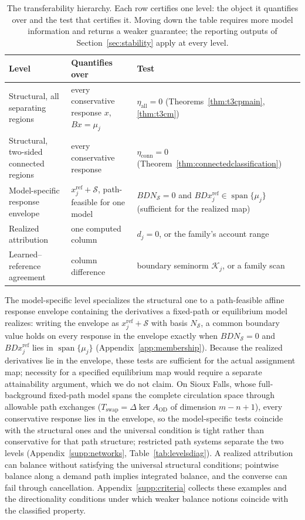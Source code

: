 \documentclass[a4paper,fleqn]{cas-sc}
\begin{document}
\begin{table}[pos=tb]
\footnotesize
\caption{The transferability hierarchy. Each row certifies one level:
the object it quantifies over and the test that certifies it. Moving
down the table requires more model information and returns a weaker
guarantee; the reporting outputs of
Section~\ref{sec:stability} apply at every level.}
\label{tab:threequestions}
\begin{tabular*}{\tblwidth}{@{}p{4.35cm}p{4.5cm}p{5.0cm}@{}}
\toprule Level & Quantifies over & Test\\\midrule
Structural, all separating regions & every conservative response $x$, $Bx=\mu_j$ & $\eta_{\mathrm{all}}=0$ (Theorems~\ref{thm:t3cpmain}, \ref{thm:t3cm})\\
Structural, two-sided connected regions & every conservative response & $\eta_{\mathrm{conn}}=0$ (Theorem~\ref{thm:connectedclassification})\\
Model-specific response envelope & $x_j^{\mathrm{ref}}+\mathcal S$, path-feasible for one model & $BDN_{\mathcal S}=0$ and $BDx_j^{\mathrm{ref}}\in\operatorname{span}\{\mu_j\}$ (sufficient for the realized map)\\
Realized attribution & one computed column & $d_j=0$, or the family's account range\\
Learned--reference agreement & column difference & boundary seminorm $\mathcal K_j$, or a family scan\\
\bottomrule\end{tabular*}\end{table}
The model-specific level specializes the structural one to a
path-feasible affine response envelope containing the derivatives a
fixed-path or equilibrium model realizes: writing the envelope as
$x_j^{\mathrm{ref}}+\mathcal S$ with basis $N_{\mathcal S}$, a common
boundary value holds on every response in the envelope exactly when
$BDN_{\mathcal S}=0$ and $BDx_j^{\mathrm{ref}}$ lies in
$\operatorname{span}\{\mu_j\}$
(Appendix~\ref{app:membership}). Because the realized derivatives lie
in the envelope, these tests are sufficient for the actual assignment
map; necessity for a specified equilibrium map would require a
separate attainability argument, which we do not claim. On Sioux
Falls, whose full-background fixed-path model spans the complete
circulation space through allowable path exchanges
($T_{\mathrm{swap}}=\Delta\ker A_{\mathrm{OD}}$ of dimension
$m-n+1$), every conservative response lies in the envelope, so the
model-specific tests coincide with the structural ones and the
universal condition is tight rather than conservative for that path
structure; restricted path systems separate the two levels
(Appendix~\ref{supp:networks}, Table~\ref{tab:levelsdiag}).
A realized attribution can balance without satisfying the universal
structural conditions; pointwise balance along a demand path implies
integrated balance, and the converse can fail through cancellation.
Appendix~\ref{supp:criteria} collects these examples and the
directionality conditions under which weaker balance notions coincide
with the classified property.
\end{document}
